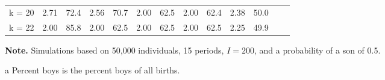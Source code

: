 \documentclass[12pt,letterpaper]{article}
\begin{document}
\begin{table}[!htp]
\begin{threeparttable}
\begin{tabular}{@{} c D{.}{.}{1.2} D{.}{.}{1.2} D{.}{.}{1.2} D{.}{.}{2.2} D{.}{.}{1.2} D{.}{.}{1.2} D{.}{.}{2.2} D{.}{.}{1.2} D{.}{.}{1.2} D{.}{.}{2.2} D{.}{.}{1.2} D{.}{.}{1.2} @{}}
 k = 20        &  2.71 &  72.4 &  2.56 &  70.7 &  2.00 &  62.5 &  2.00 &  62.4 &  2.38 &  50.0 \\
 k = 22        &  2.00 &  85.8 &  2.00 &  62.5 &  2.00 &  62.5 &  2.00 &  62.5 &  2.25 &  49.9 \\
\bottomrule
\end{tabular}
\begin{tablenotes} \scriptsize
\item \hspace*{-0.5em} \textbf{Note.} Simulations based on  50,000 individuals, 15 periods, $ I = 200 $,
 and a probability of a son of 0.5.
\item[a]Percent boys is the percent boys of all births.
\end{tablenotes}
\end{threeparttable}
\normalsize
\end{table}
\end{document}

